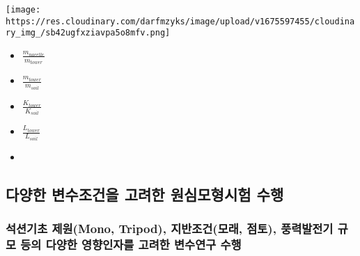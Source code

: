 \documentclass[
  letterpaper,
  DIV=11,
  numbers=noendperiod]{scrreprt}
\providecommand{\tightlist}{%
  \setlength{\itemsep}{0pt}\setlength{\parskip}{0pt}}\usepackage{longtable,booktabs,array}
\begin{document}
\texttt{[image: https://res.cloudinary.com/darfmzyks/image/upload/v1675597455/cloudinary\_img\_/sb42ugfxziavpa5o8mfv.png]}

\begin{itemize}
\tightlist
\item
  \(\frac{m_{nacelle}}{m_{tower}}\)
\item
  \(\frac{m_{tower}}{m_{soil}}\)
\item
  \(\frac{K_{tower}}{K_{soil}}\)
\item
  \(\frac{L_{tower}}{L_{soil}}\)
\item
\end{itemize}

\hypertarget{uxb2e4uxc591uxd55c-uxbcc0uxc218uxc870uxac74uxc744-uxace0uxb824uxd55c-uxc6d0uxc2ecuxbaa8uxd615uxc2dcuxd5d8-uxc218uxd589}{%
\subsection{다양한 변수조건을 고려한 원심모형시험
수행}\label{uxb2e4uxc591uxd55c-uxbcc0uxc218uxc870uxac74uxc744-uxace0uxb824uxd55c-uxc6d0uxc2ecuxbaa8uxd615uxc2dcuxd5d8-uxc218uxd589}}

\hypertarget{uxc11duxc158uxae30uxcd08-uxc81cuxc6d0mono-tripod-uxc9c0uxbc18uxc870uxac74uxbaa8uxb798-uxc810uxd1a0-uxd48duxb825uxbc1cuxc804uxae30-uxaddcuxbaa8-uxb4f1uxc758-uxb2e4uxc591uxd55c-uxc601uxd5a5uxc778uxc790uxb97c-uxace0uxb824uxd55c-uxbcc0uxc218uxc5f0uxad6c-uxc218uxd589}{%
\subsubsection{석션기초 제원(Mono, Tripod), 지반조건(모래, 점토),
풍력발전기 규모 등의 다양한 영향인자를 고려한 변수연구
수행}\label{uxc11duxc158uxae30uxcd08-uxc81cuxc6d0mono-tripod-uxc9c0uxbc18uxc870uxac74uxbaa8uxb798-uxc810uxd1a0-uxd48duxb825uxbc1cuxc804uxae30-uxaddcuxbaa8-uxb4f1uxc758-uxb2e4uxc591uxd55c-uxc601uxd5a5uxc778uxc790uxb97c-uxace0uxb824uxd55c-uxbcc0uxc218uxc5f0uxad6c-uxc218uxd589}}
\end{document}

